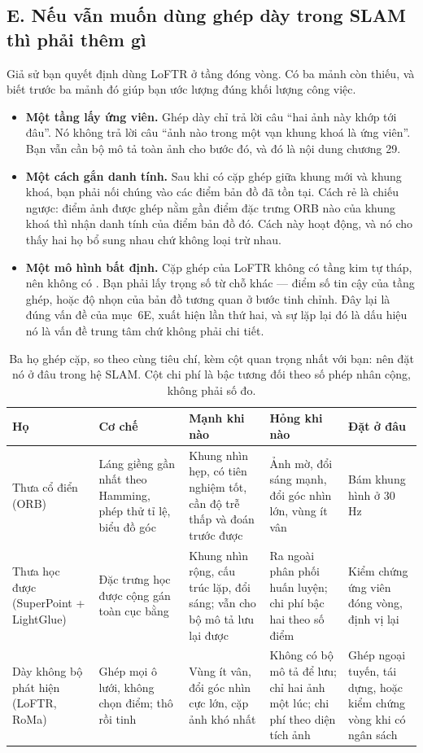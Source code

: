 \documentclass[../../deep_learning.tex]{subfiles}
\begin{document}
\subsection{E. Nếu vẫn muốn dùng ghép dày trong SLAM thì phải thêm gì}
Giả sử bạn quyết định dùng LoFTR ở tầng đóng vòng. Có ba mảnh còn thiếu, và biết trước ba mảnh đó giúp bạn ước lượng đúng khối lượng công việc.

\begin{itemize}
\item \textbf{Một tầng lấy ứng viên.} Ghép dày chỉ trả lời câu ``hai ảnh này khớp tới đâu''. Nó không trả lời câu ``ảnh nào trong một vạn khung khoá là ứng viên''. Bạn vẫn cần bộ mô tả toàn ảnh cho bước đó, và đó là nội dung chương 29.
\item \textbf{Một cách gắn danh tính.} Sau khi có cặp ghép giữa khung mới và khung khoá, bạn phải nối chúng vào các điểm bản đồ đã tồn tại. Cách rẻ là chiếu ngược: điểm ảnh được ghép nằm gần điểm đặc trưng ORB nào của khung khoá thì nhận danh tính của điểm bản đồ đó. Cách này hoạt động, và nó cho thấy hai họ bổ sung nhau chứ không loại trừ nhau.
\item \textbf{Một mô hình bất định.} Cặp ghép của LoFTR không có tầng kim tự tháp, nên không có . Bạn phải lấy trọng số từ chỗ khác --- điểm số tin cậy của tầng ghép, hoặc độ nhọn của bản đồ tương quan ở bước tinh chỉnh. Đây lại là đúng vấn đề của mục~6E, xuất hiện lần thứ hai, và sự lặp lại đó là dấu hiệu nó là vấn đề trung tâm chứ không phải chi tiết.
\end{itemize}

\begin{table}[H]\centering\footnotesize
\caption{Ba họ ghép cặp, so theo cùng tiêu chí, kèm cột quan trọng nhất với bạn: nên đặt nó ở đâu trong hệ SLAM. Cột chi phí là bậc tương đối theo số phép nhân cộng, không phải số đo.}
\label{tab:f28-ba-ho}
\begin{tabularx}{\linewidth}{@{}L{2.3cm}L{3.0cm}L{2.7cm}YL{2.5cm}@{}}
\toprule
\textbf{Họ} & \textbf{Cơ chế} & \textbf{Mạnh khi nào} & \textbf{Hỏng khi nào} & \textbf{Đặt ở đâu}\\
\midrule
Thưa cổ điển (ORB) & Láng giềng gần nhất theo Hamming, phép thử tỉ lệ, biểu đồ góc & Khung nhìn hẹp, có tiên nghiệm tốt, cần độ trễ thấp và đoán trước được & Ảnh mờ, đổi sáng mạnh, đổi góc nhìn lớn, vùng ít vân & Bám khung hình ở 30 Hz\\
Thưa học được (SuperPoint + LightGlue) & Đặc trưng học được cộng gán toàn cục bằng  & Khung nhìn rộng, cấu trúc lặp, đổi sáng; vẫn cho bộ mô tả lưu lại được & Ra ngoài phân phối huấn luyện; chi phí bậc hai theo số điểm & Kiểm chứng ứng viên đóng vòng, định vị lại\\
Dày không bộ phát hiện (LoFTR, RoMa) & Ghép mọi ô lưới, không chọn điểm; thô rồi tinh & Vùng ít vân, đổi góc nhìn cực lớn, cặp ảnh khó nhất & Không có bộ mô tả để lưu; chỉ hai ảnh một lúc; chi phí theo diện tích ảnh & Ghép ngoại tuyến, tái dựng, hoặc kiểm chứng vòng khi có ngân sách\\
\bottomrule
\end{tabularx}
\end{table}
\end{document}
